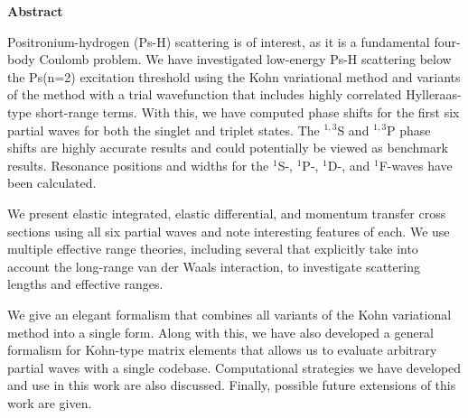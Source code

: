 
\thispagestyle{plain}
\begin{center}
    \large
    \textbf{Abstract}
\end{center}

Positronium-hydrogen (Ps-H) scattering is of interest, as it is a fundamental 
four-body Coulomb problem. We have investigated low-energy Ps-H scattering 
below the Ps(n=2) excitation threshold using the Kohn variational method and 
variants of the method with a trial wavefunction that includes highly 
correlated Hylleraas-type short-range terms. With this, we have computed 
phase shifts for the first six partial waves for both the singlet and triplet 
states. The $^{1,3}$S and $^{1,3}$P phase shifts are highly accurate results
and could potentially be viewed as benchmark results.
Resonance positions and widths for the $^1$S-, $^1$P-, $^1$D-, and
$^1$F-waves have been calculated.

We present elastic integrated, elastic differential, and momentum transfer 
cross sections using all six partial waves and note interesting features of 
each. We use multiple effective range theories, including several that 
explicitly take into account the long-range van der Waals interaction, to 
investigate scattering lengths and effective ranges.

We give an elegant formalism that combines all variants of the Kohn variational
method into a single form. Along with this, we have also developed a general
formalism for Kohn-type matrix elements that allows us to evaluate arbitrary 
partial waves with a single codebase. Computational strategies we have 
developed and use in this work are also discussed. Finally, possible future 
extensions of this work are given.
